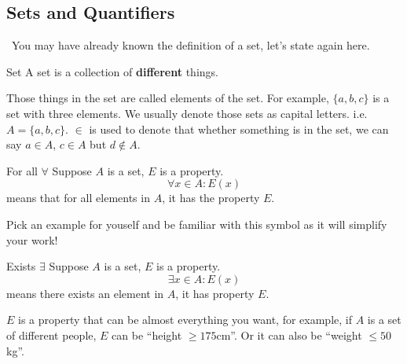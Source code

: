 \documentclass{article}
\begin{document}
\subsection{Sets and Quantifiers}
\quad\ You may have already known the definition of a set, let's state again here.
\begin{defin}{Set}
    A set is a collection of \textbf{different} things.
\end{defin}
Those things in the set are called elements of the set. For example, $\{a,b,c\}$ is a set with three elements. We
usually denote those sets as capital letters. i.e. $A = \{a,b,c\}$. $\in$ is used to denote that whether something is
in the set, we can say $a \in A$, $c \in A$ but $d \not\in A$.
\begin{defin}{For all $\forall$}
    Suppose $A$ is a set, $E$ is a property.
    $$\forall x\in A: E(x)$$
    means that for all elements in $A$, it has the property $E$.
\end{defin}
Pick an example for youself and be familiar with this symbol as it will simplify your work!
\begin{defin}{Exists $\exists$}
    Suppose $A$ is a set, $E$ is a property.
    $$\exists x\in A: E(x)$$
    means there exists an element in $A$, it has property $E$.
\end{defin}
$E$ is a property that can be almost everything you want, for example, if $A$ is a set of different people, $E$ can be ``height $\geq 175$cm''. Or
it can also be ``weight $\leq 50$kg''.\\
\end{document}
